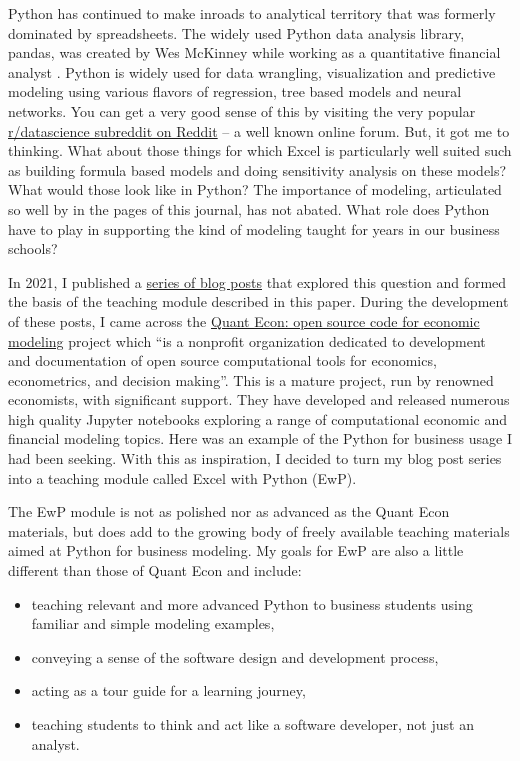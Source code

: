 \documentclass[ited,blindrev]{informs3}              %
\begin{document}
Python has continued to make inroads to analytical territory that was formerly dominated by spreadsheets. The widely used Python data analysis library, pandas, was created by Wes McKinney while working as a quantitative financial analyst \citep{mckinney2022python}. Python is widely used for data wrangling, visualization and predictive modeling using various flavors of regression, tree based models and neural networks. You can get a very good sense of this by visiting the very popular \href{https://www.reddit.com/r/datascience/}{r/datascience subreddit on Reddit} -- a well known online forum. But, it got me to thinking. What about those things for which Excel is particularly well suited such as building formula based models and doing sensitivity analysis on these models? What would those look like in Python? The importance of modeling, articulated so well by \citet{powellTeachingModelingManagement2001} in the pages of this journal, has not abated. What role does Python have to play in supporting the kind of modeling taught for years in our business schools?

In 2021, I published a \href{https://bitsofanalytics.org/#category=excel}{series of blog posts} that explored this question and formed the basis of the teaching module described in this paper. During the development of these posts, I came across the \href{https://quantecon.org/}{Quant Econ: open source code for economic modeling} project which ``is a nonprofit organization dedicated to development and documentation of open source computational tools for economics, econometrics, and decision making''. This is a mature project, run by renowned economists, with significant support. They have developed and released numerous high quality Jupyter notebooks exploring a range of computational economic and financial modeling topics. Here was an example of the Python for business usage I had been seeking. With this as inspiration, I decided to turn my blog post series into a teaching module called Excel with Python (EwP). 

The EwP module is not as polished nor as advanced as the Quant Econ materials, but does add to the growing body of freely available teaching materials aimed at Python for business modeling. My goals for EwP are also a little different than those of Quant Econ and include:

\begin{itemize}
	\item teaching relevant and more advanced Python to business students using familiar and simple modeling examples,
	\item conveying a sense of the software design and development process,
	\item acting as a tour guide for a learning journey,
	\item teaching students to think and act like a software developer, not just an analyst.
\end{itemize}
\end{document}
